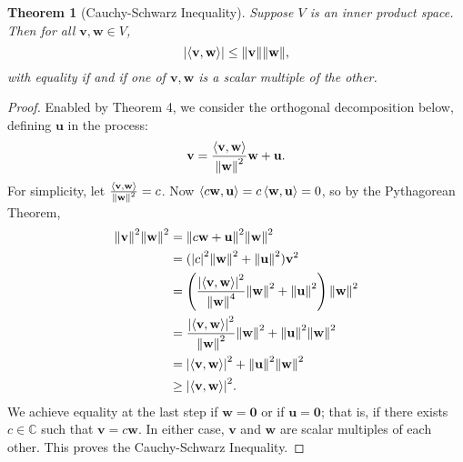 \documentclass[11pt]{article}
\renewcommand{\vec}[1]{\mathbf{#1}}
\newtheorem{theorem}{Theorem}
\begin{document}
\begin{adjustwidth}{0.5cm}{}
  \begin{theorem}[Cauchy-Schwarz Inequality]
	  Suppose $V$ is an inner product space. Then for all $\vec{v}, \vec{w} \in V$,
	  \[
		  \abs{\ev{\vec{v}, \vec{w}}} \le \norm{\vec{v}} \norm{\vec{w}},
	  \]
	  with equality if and if one of $\vec{v}, \vec{w}$ is a scalar multiple of the other. 
  \end{theorem}
	\begin{proof}
		Enabled by Theorem 4, we consider the orthogonal decomposition below, defining $\vec{u}$ in the process:
		\[
			\vec{v} = \frac{\ev{\vec{v}, \vec{w}}}{\norm{\vec{w}}^{2}} \vec{w} + \vec{u}.
		\]
		For simplicity, let $\frac{\ev{\vec{v}, \vec{w}}}{\norm{\vec{w}}^{2}} = c$. Now $\ev{c \vec{w}, \vec{u}} = c \ev{\vec{w}, \vec{u}} = 0$, so by the Pythagorean Theorem,
		\begin{align*}
			\norm{\vec{v}}^{2} \norm{\vec{w}}^{2} &= \norm{c \vec{w} + \vec{u}}^{2}\norm{\vec{w}}^{2} \\
			&= (\abs{c}^{2} \norm{\vec{w}}^{2} + \norm{\vec{u}}^{2}) \vec{v}^{2} \\
			&= \left( \frac{\abs{\ev{\vec{v}, \vec{w}}}^{2}}{\norm{\vec{w}}^{4}} \norm{\vec{w}}^{2} + \norm{\vec{u}}^{2} \right) \norm{\vec{w}}^{2} \\
			&= \frac{\abs{\ev{\vec{v}, \vec{w}}}^{2}}{\norm{\vec{w}}^{2}} \norm{\vec{w}}^{2} + \norm{\vec{u}}^{2} \norm{\vec{w}}^{2} \\
			&= \abs{\ev{\vec{v}, \vec{w}}}^{2} + \norm{\vec{u}}^{2} \norm{\vec{w}}^{2} \\
			&\ge \abs{\ev{\vec{v}, \vec{w}}}^{2}.
		\end{align*} 
		We achieve equality at the last step if $\vec{w} = \vec{0}$ or if $\vec{u} = \vec{0}$; that is, if there exists $c \in \mathbb{C}$ such that $\vec{v} = c \vec{w}$. In either case, $\vec{v}$ and $\vec{w}$ are scalar multiples of each other. This proves the Cauchy-Schwarz Inequality.
	\end{proof}
\end{adjustwidth}
\end{document}
